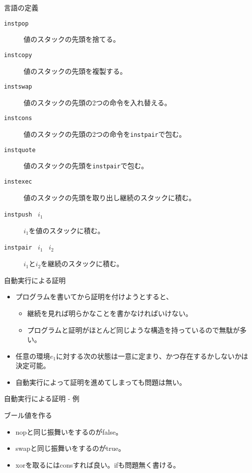\documentclass[cjk, 14pt, dvipdfm]{beamer}
\begin{document}
\begin{frame}{言語の定義}

  \begin{description}
    \item[\texttt{instpop}] 値のスタックの先頭を捨てる。
    \item[\texttt{instcopy}] 値のスタックの先頭を複製する。
    \item[\texttt{instswap}] 値のスタックの先頭の2つの命令を入れ替える。
    \item[\texttt{instcons}] 値のスタックの先頭の2つの命令を\texttt{instpair}で包む。
    \item[\texttt{instquote}] 値のスタックの先頭を\texttt{instpair}で包む。
    \item[\texttt{instexec}] 値のスタックの先頭を取り出し継続のスタックに積む。
    \item[\texttt{instpush} \, $i_1$] $i_1$を値のスタックに積む。
    \item[\texttt{instpair} \, $i_1$ \, $i_2$] $i_1$と$i_2$を継続のスタックに積む。
  \end{description}

\end{frame}

\begin{frame}{自動実行による証明}

  \begin{itemize}
    \item プログラムを書いてから証明を付けようとすると、
    \begin{itemize}
      \item 継続を見れば明らかなことを書かなければいけない。
      \item プログラムと証明がほとんど同じような構造を持っているので無駄が多い。
    \end{itemize}
    \item 任意の環境$e_1$に対する次の状態は一意に定まり、かつ存在するかしないかは決定可能。
    \item 自動実行によって証明を進めてしまっても問題は無い。
  \end{itemize}

\end{frame}

\begin{frame}{自動実行による証明 - 例}

\end{frame}

\begin{frame}{ブール値を作る}

  \begin{itemize}
    \item nopと同じ振舞いをするのがfalse。
    \item swapと同じ振舞いをするのがtrue。
    \item xorを取るにはconsすれば良い。ifも問題無く書ける。
  \end{itemize}

\end{frame}
\end{document}
